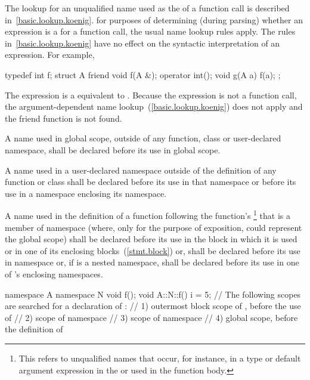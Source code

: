 \pnum
The lookup for an unqualified name used as the
 of a function call is described
in~\ref{basic.lookup.koenig}. \enternote for purposes of determining
(during parsing) whether an expression is a
 for a function call, the usual name lookup
rules apply. The rules in~\ref{basic.lookup.koenig} have no effect on
the syntactic interpretation of an expression. For example,

\begin{codeblock}
typedef int f;
struct A {
	friend void f(A &);
	operator int();
	void g(A a) {
		f(a);
	}
};
\end{codeblock}

The expression  is a  equivalent
to . Because the expression is not a function call, the
argument-dependent
name lookup~(\ref{basic.lookup.koenig}) does not apply and the friend
function  is not found. \exitnote

\pnum
A name used in global scope, outside of any function, class or
user-declared namespace, shall be declared before its use in global
scope.

\pnum
A name used in a user-declared namespace outside of the definition of
any function or class shall be declared before its use in that namespace
or before its use in a namespace enclosing its namespace.

\pnum
A name used in the definition of a function following the function's
\footnote{This refers to unqualified names
that occur, for instance, in
a type or default argument expression in the
 or used in the function body.}
that is a member of namespace  (where, only for the purpose of
exposition,  could represent the global scope) shall be
declared before its use in the block in which it is used or in one of
its enclosing blocks~(\ref{stmt.block}) or, shall be declared before its
use in namespace  or, if  is a nested namespace, shall
be declared before its use in one of 's enclosing namespaces.\\
\enterexample

\begin{codeblock}
namespace A {
	namespace N {
		void f();
	}
}
void A::N::f() {
	i = 5;
	// The following scopes are searched for a declaration of :
	// 1) outermost block scope of , before the use of 
	// 2) scope of namespace 
	// 3) scope of namespace 
	// 4) global scope, before the definition of 
}
\end{codeblock}
\exitexampleb

